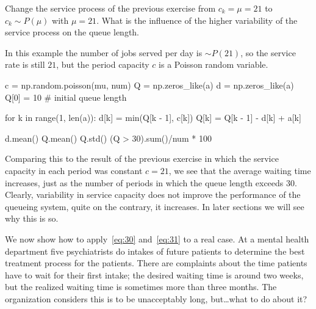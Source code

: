 \begin{exercise}
  Change the service process of the previous exercise from $c_k =\mu=21$ to $c_k\sim P(\mu)$ with $\mu=21$. What is the influence of the higher variability of the service process on the queue length. 
  \begin{solution}
In this  example the number of jobs served per day is $\sim P(21)$, so the service rate is
still $21$, but the period capacity $c$ is a Poisson random variable. 

\begin{pyconsole}
c = np.random.poisson(mu, num)
Q = np.zeros_like(a)
d = np.zeros_like(a)
Q[0] = 10  # initial queue length

for k in range(1, len(a)):
    d[k] = min(Q[k - 1], c[k])
    Q[k] = Q[k - 1] - d[k] + a[k]

d.mean()
Q.mean()
Q.std()
(Q > 30).sum()/num * 100
\end{pyconsole}

Comparing this to the result of the previous exercise in which the service capacity in each period was constant $c=21$, we see that the average waiting time increases, just as the number of periods in which the queue length exceeds 30.
Clearly, variability in service capacity does not improve the performance of the queueing system, quite on the contrary, it increases.
In later sections we will see why this is so.
  \end{solution}
\end{exercise}


We now show how to apply~\eqref{eq:30} and~\eqref{eq:31} to a real case. At a mental health department five psychiatrists do intakes of future
patients to determine the best treatment process for the patients.
There are complaints about the time patients have to wait for their
first intake; the desired waiting time is around two weeks, but the
realized waiting time is sometimes more than three months. The
organization considers this is to be unacceptably long, but\ldots what to do about it?

